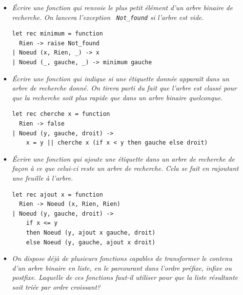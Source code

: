 \documentclass[11pt, a4paper]{article}
\begin{document}
\begin{itemize}

  \item \emph{Écrire une fonction qui renvoie le plus petit élément
        d'un arbre binaire de recherche. On lancera l'exception {\tt
        Not\_found} si l'arbre est vide.}

        \smallskip

\begin{verbatim}
let rec minimum = function
  Rien -> raise Not_found
| Noeud (x, Rien, _) -> x
| Noeud (_, gauche, _) -> minimum gauche
\end{verbatim}

        \smallskip

  \item \emph{Écrire une fonction qui indique si une étiquette donnée
        apparaît dans un arbre de recherche donné. On tirera parti du
        fait que l'arbre est classé pour que la recherche soit plus
        rapide que dans un arbre binaire quelconque.}

        \smallskip

\begin{verbatim}
let rec cherche x = function
  Rien -> false
| Noeud (y, gauche, droit) ->
    x = y || cherche x (if x < y then gauche else droit)
\end{verbatim}

        \smallskip

  \item \emph{Écrire une fonction qui ajoute une étiquette dans un
        arbre de recherche de façon à ce que celui-ci reste un arbre
        de recherche. Cela se fait en rajoutant une feuille à
        l'arbre.}

        \smallskip

\begin{verbatim}
let rec ajout x = function
  Rien -> Noeud (x, Rien, Rien)
| Noeud (y, gauche, droit) ->
    if x <= y
    then Noeud (y, ajout x gauche, droit)
    else Noeud (y, gauche, ajout x droit)
\end{verbatim}

        \smallskip

  \item \emph{On dispose déjà de plusieurs fonctions capables de
        transformer le contenu d'un arbre binaire en liste, en le
        parcourant dans l'ordre préfixe, infixe ou postfixe. Laquelle
        de ces fonctions faut-il utiliser pour que la liste résultante
        soit triée par ordre croissant?}


\end{itemize}
\end{document}
